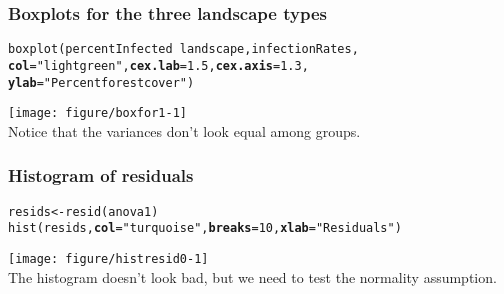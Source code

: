 \documentclass[color=usenames,dvipsnames]{beamer}\usepackage[]{graphicx}\usepackage[]{color}
\makeatletter
\newcommand{\hlnum}[1]{\textcolor[rgb]{0.69,0.494,0}{#1}}%
\newcommand{\hlstr}[1]{\textcolor[rgb]{0.749,0.012,0.012}{#1}}%
\newcommand{\hlopt}[1]{\textcolor[rgb]{0,0,0}{#1}}%
\newcommand{\hlstd}[1]{\textcolor[rgb]{0,0,0}{#1}}%
\newcommand{\hlkwb}[1]{\textcolor[rgb]{0,0.341,0.682}{#1}}%
\newcommand{\hlkwc}[1]{\textcolor[rgb]{0,0,0}{\textbf{#1}}}%
\newcommand{\hlkwd}[1]{\textcolor[rgb]{0.004,0.004,0.506}{#1}}%
\newenvironment{kframe}{%
 \def\at@end@of@kframe{}%
 \ifinner\ifhmode%
  \def\at@end@of@kframe{\end{minipage}}%
  \begin{minipage}{\columnwidth}%
 \fi\fi%
 \def\FrameCommand##1{\hskip\@totalleftmargin \hskip-\fboxsep
 \colorbox{shadecolor}{##1}\hskip-\fboxsep
     \hskip-\linewidth \hskip-\@totalleftmargin \hskip\columnwidth}%
 \MakeFramed {\advance\hsize-\width
   \@totalleftmargin\z@ \linewidth\hsize
   \@setminipage}}%
 {\par\unskip\endMakeFramed%
 \at@end@of@kframe}
\newenvironment{knitrout}{}{} %
\makeatother
\begin{document}
\begin{frame}[fragile]
  \frametitle{Boxplots for the three landscape types}
\begin{knitrout}\footnotesize
{}\color{fgcolor}\begin{kframe}
\begin{alltt}
\hlkwd{boxplot}\hlstd{(percentInfected}\hlopt{~}\hlstd{landscape, infectionRates,}
        \hlkwc{col}\hlstd{=}\hlstr{"lightgreen"}\hlstd{,} \hlkwc{cex.lab}\hlstd{=}\hlnum{1.5}\hlstd{,} \hlkwc{cex.axis}\hlstd{=}\hlnum{1.3}\hlstd{,}
        \hlkwc{ylab}\hlstd{=}\hlstr{"Percent forest cover"}\hlstd{)}
\end{alltt}
\end{kframe}
\end{knitrout}
\vspace{-0.5cm}
\centering
\texttt{[image: figure/boxfor1-1]} \\
\vfill
Notice that the variances don't look equal among groups.
\end{frame}









\begin{frame}[fragile]
  \frametitle{Histogram of residuals}
\scriptsize
\begin{knitrout}
\color{fgcolor}\begin{kframe}
\begin{alltt}
\hlstd{resids} \hlkwb{<-} \hlkwd{resid}\hlstd{(anova1)}
\hlkwd{hist}\hlstd{(resids,} \hlkwc{col}\hlstd{=}\hlstr{"turquoise"}\hlstd{,} \hlkwc{breaks}\hlstd{=}\hlnum{10}\hlstd{,} \hlkwc{xlab}\hlstd{=}\hlstr{"Residuals"}\hlstd{)}
\end{alltt}
\end{kframe}
\end{knitrout}
\centering
\texttt{[image: figure/histresid0-1]} \\
\vfill
The histogram doesn't look bad, but we need to test the normality
assumption.
\end{frame}
\end{document}
